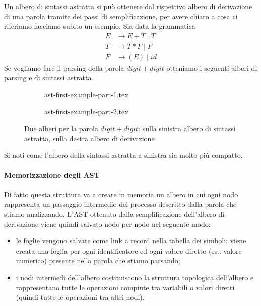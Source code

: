 \documentclass[class=book, crop=false, oneside, 12pt]{standalone}
\begin{document}
Un albero di sintassi astratta si può ottenere dal rispettivo albero di derivazione di una parola tramite dei passi di semplificazione, per avere chiaro a cosa ci riferiamo facciamo subito un esempio.
Sia data la grammatica
\begin{align*}
    E &\to E+T \mid T \\
    T &\to T*F \mid F \\
    F &\to (E) \mid id
\end{align*}
Se vogliamo fare il parsing della parola \(digit+digit\) otteniamo i seguenti alberi di parsing e di sintassi astratta.
\begin{figure}[H]
    \centering
    \begin{subfigure}{.5\textwidth}
        \centering
        {ast-first-example-part-1.tex}
    \end{subfigure}%
    \begin{subfigure}{.5\textwidth}
        \centering
        {ast-first-example-part-2.tex}
    \end{subfigure}%
    \caption{Due alberi per la parola \(digit+digit\): sulla sinistra albero di sintassi astratta, sulla destra albero di derivazione}
    \label{fig:ast-first-example}
\end{figure}
Si noti come l'albero della sintassi astratta a sinistra sia molto più compatto.

\paragraph{Memorizzazione degli AST} Di fatto questa struttura va a creare in memoria un albero in cui ogni nodo rappresenta un passaggio intermedio del processo descritto dalla parola che stiamo analizzando. L'AST ottenuto dalla semplificazione dell'albero di derivazione viene quindi salvato nodo per nodo nel seguente modo:
\begin{itemize}
    \item le foglie vengono salvate come link a record nella tabella dei simboli: viene creata una foglia per ogni identificatore ed ogni valore diretto (es.: valore numerico) presente nella parola che stiamo parsando;
    \item i nodi intermedi dell'albero costituiscono la struttura topologica dell'albero e rappresentano tutte le operazioni compiute tra variabili o valori diretti (quindi tutte le operazioni tra altri nodi).
\end{itemize}
\end{document}
